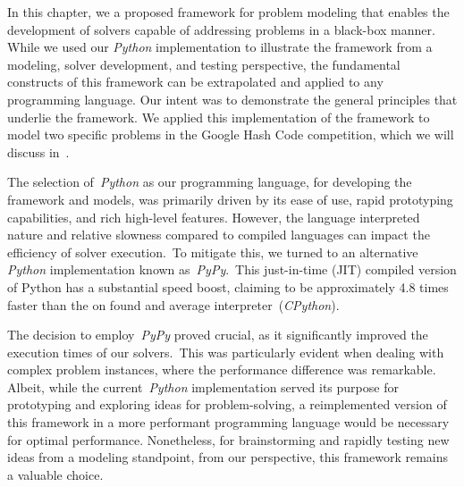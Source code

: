 In this chapter, we a proposed framework for problem modeling that enables the
development of solvers capable of addressing problems in a black-box manner.
While we used our \emph{Python} implementation to illustrate the framework from
a modeling, solver development, and testing perspective, the fundamental
constructs of this framework can be extrapolated and applied to any programming
language. Our intent was to demonstrate the general principles that underlie the
framework. We applied this implementation of the framework to model two specific
problems in the Google Hash Code competition, which we will discuss
in~.

The selection of~\emph{Python} as our programming language, for developing the
framework and models, was primarily driven by its ease of use, rapid prototyping
capabilities, and rich high-level features. However, the language interpreted
nature and relative slowness compared to compiled languages can impact the
efficiency of solver execution.~To mitigate this, we turned to an alternative
\emph{Python} implementation known as~\emph{PyPy}.~This just-in-time (JIT) compiled
version of Python has a substantial speed boost, claiming to be approximately
4.8 times faster than the on found and average interpreter~(\emph{CPython}).


The decision to employ~\emph{PyPy} proved crucial, as it significantly improved the
execution times of our solvers.~This was particularly evident when dealing with
complex problem instances, where the performance difference was remarkable.
Albeit, while the current~\emph{Python} implementation served its purpose for
prototyping and exploring ideas for problem-solving, a reimplemented version of
this framework in a more performant programming language would be necessary for
optimal performance. Nonetheless, for brainstorming and rapidly testing new
ideas from a modeling standpoint, from our perspective, this framework remains
a valuable choice.